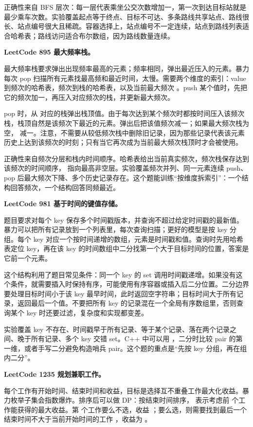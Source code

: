 正确性来自 BFS 层次：每一层代表乘坐公交次数增加一，第一次到达目标站就是最少乘车次数。实验覆盖起点等于终点、目标不可达、多条路线共享站点、路线很长、站点编号很大且稀疏。容器选择上，站点编号不一定连续，站点到路线列表适合哈希表；路线访问适合布尔数组，因为路线数量连续。

\noindent\textbf{LeetCode 895 最大频率栈。}

最大频率栈要求弹出出现频率最高的元素；频率相同，弹出最近压入的元素。暴力每次 pop 扫描所有元素找最高频和最近时间，太慢。需要两个维度的索引：value 到频次的哈希表，频次到栈的哈希表，以及当前最大频次 。push 某个值时，先把它的频次加一，再压入对应频次的栈，并更新最大频次。

pop 时，从  对应的栈弹出栈顶值。由于每次达到某个频次时都按时间压入该频次栈，栈顶自然是该频次下最近的元素。弹出后把该值频次减一；如果最大频次栈为空， 减一。注意，不需要从较低频次栈中删除旧记录，因为那些记录代表该元素历史上达到该频次的时刻；只有当它再次成为当前最大频次栈顶时才会被使用。

正确性来自频次分层和栈内时间顺序。哈希表给出当前真实频次，频次栈保存达到该频次的时间顺序， 指向最高非空层。实验覆盖频次并列、同一元素连续 push、pop 后最大频次下降、多个历史记录存在。这个题能训练“按维度拆索引”：一个结构回答频次，一个结构回答同频最近。

\noindent\textbf{LeetCode 981 基于时间的键值存储。}

题目要求对每个 key 保存多个时间戳版本，并查询不超过给定时间戳的最新值。暴力可以把所有记录放到一个列表里，每次查询扫描；更好的模型是按 key 分组。每个 key 对应一个按时间递增的数组，元素是时间戳和值。查询时先用哈希表定位 key，再在该 key 的时间数组中二分找第一个大于目标时间的位置，答案是它前一个元素。

这个结构利用了题目常见条件：同一个 key 的 set 调用时间戳递增。如果没有这个条件，就需要插入时保持有序，可能使用有序容器或插入后二分位置。二分边界要处理目标时间小于该 key 最早时间，此时返回空字符串；目标时间大于所有记录，返回最后一个值。不要把所有 key 的记录混在一个全局有序数组里，否则查询某个 key 时还要过滤，复杂度和实现都变差。

实验覆盖 key 不存在、时间戳早于所有记录、等于某个记录、落在两个记录之间、晚于所有记录、多个 key 交错 set。C++ 中可以用 ，二分时比较 pair 的第一维，或者手写二分避免构造哨兵 pair。这个题的重点是“先按 key 分组，再在组内二分”。

\noindent\textbf{LeetCode 1235 规划兼职工作。}

每个工作有开始时间、结束时间和收益，目标是选择互不重叠工作最大化收益。暴力枚举子集会指数爆炸。排序后可以做 DP：按结束时间排序， 表示考虑前  个工作能获得的最大收益。第  个工作要么不选，收益 ；要么选，则需要找到最后一个结束时间不大于当前开始时间的工作 ，收益为 。

